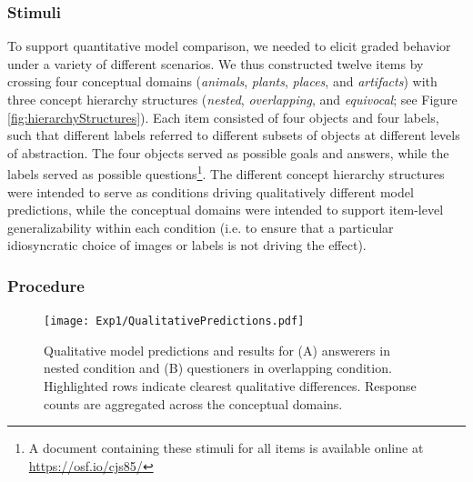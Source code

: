\documentclass[11pt, floatsintext]{apa6}
\begin{document}
\subsubsection{Stimuli} 

To support quantitative model comparison, we needed to elicit graded behavior under a variety of different scenarios.
We thus constructed twelve items by crossing four conceptual domains (\emph{animals}, \emph{plants}, \emph{places}, and \emph{artifacts}) with three concept hierarchy structures (\emph{nested}, \emph{overlapping}, and \emph{equivocal}; see Figure \ref{fig:hierarchyStructures}).
Each item consisted of four objects and four labels, such that different labels referred to different subsets of objects at different levels of abstraction. 
The four objects served as possible goals and answers, while the labels served as possible questions\footnote{A document containing these stimuli for all items is available online at \scriptsize\url{https://osf.io/cjs85/}}.
The different concept hierarchy structures were intended to serve as conditions driving qualitatively different model predictions, while the conceptual domains were intended to support item-level generalizability within each condition (i.e. to ensure that a particular idiosyncratic choice of images or labels is not driving the effect).


\subsubsection{Procedure}

\begin{figure}[tbh]
\begin{center}
\texttt{[image: Exp1/QualitativePredictions.pdf]}
\end{center}
\caption{\footnotesize  Qualitative model predictions and results for (A) answerers in nested condition and (B) questioners in overlapping condition. Highlighted rows indicate clearest qualitative differences. Response counts are aggregated across the conceptual domains.}
\label{fig:exp1qualitative}
\end{figure}
\end{document}
